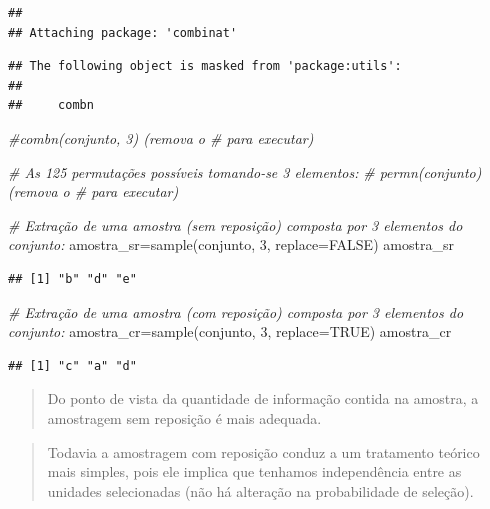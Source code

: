 \documentclass[
]{book}
\newenvironment{Shaded}{\begin{snugshade}}{\end{snugshade}}
\newcommand{\AttributeTok}[1]{\textcolor[rgb]{0.77,0.63,0.00}{#1}}
\newcommand{\CommentTok}[1]{\textcolor[rgb]{0.56,0.35,0.01}{\textit{#1}}}
\newcommand{\ConstantTok}[1]{\textcolor[rgb]{0.00,0.00,0.00}{#1}}
\newcommand{\DecValTok}[1]{\textcolor[rgb]{0.00,0.00,0.81}{#1}}
\newcommand{\FunctionTok}[1]{\textcolor[rgb]{0.00,0.00,0.00}{#1}}
\newcommand{\NormalTok}[1]{#1}
\newcommand{\OtherTok}[1]{\textcolor[rgb]{0.56,0.35,0.01}{#1}}
\begin{document}
\begin{verbatim}
## 
## Attaching package: 'combinat'
\end{verbatim}

\begin{verbatim}
## The following object is masked from 'package:utils':
## 
##     combn
\end{verbatim}

\begin{Shaded}
\begin{Highlighting}[]
\CommentTok{\#combn(conjunto, 3) (remova o \# para executar)}

\CommentTok{\# As 125 permutações possíveis tomando{-}se 3 elementos:}
\CommentTok{\# permn(conjunto) (remova o \# para executar)}

\CommentTok{\# Extração de uma amostra (sem reposição) composta por 3 elementos do conjunto:}
\NormalTok{amostra\_sr}\OtherTok{=}\FunctionTok{sample}\NormalTok{(conjunto, }\DecValTok{3}\NormalTok{, }\AttributeTok{replace=}\ConstantTok{FALSE}\NormalTok{)}
\NormalTok{amostra\_sr}
\end{Highlighting}
\end{Shaded}

\begin{verbatim}
## [1] "b" "d" "e"
\end{verbatim}

\begin{Shaded}
\begin{Highlighting}[]
\CommentTok{\# Extração de uma amostra (com reposição) composta por 3 elementos do conjunto:}
\NormalTok{amostra\_cr}\OtherTok{=}\FunctionTok{sample}\NormalTok{(conjunto, }\DecValTok{3}\NormalTok{, }\AttributeTok{replace=}\ConstantTok{TRUE}\NormalTok{)}
\NormalTok{amostra\_cr}
\end{Highlighting}
\end{Shaded}

\begin{verbatim}
## [1] "c" "a" "d"
\end{verbatim}

\hfill\break

\begin{quote}
Do ponto de vista da quantidade de informação contida na amostra, a amostragem sem reposição é mais adequada.
\end{quote}

\hfill\break

\begin{quote}
Todavia a amostragem com reposição conduz a um tratamento teórico mais simples, pois ele implica que tenhamos independência entre as unidades selecionadas (não há alteração na probabilidade de seleção).
\end{quote}
\end{document}
